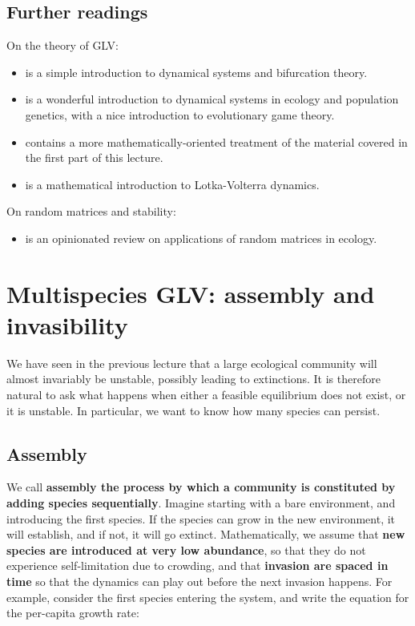 \documentclass[]{book}
\providecommand{\tightlist}{%
  \setlength{\itemsep}{0pt}\setlength{\parskip}{0pt}}
\begin{document}
\hypertarget{further-readings}{%
\section{Further readings}\label{further-readings}}

On the theory of GLV:

\begin{itemize}
\item
  \citet{strogatz2018nonlinear} is a simple introduction to dynamical systems and bifurcation theory.
\item
  \citet{hofbauer1998evolutionary} is a wonderful introduction to dynamical systems in ecology and population genetics, with a nice introduction to evolutionary game theory.
\item
  \citet{hadeler2017topics} contains a more mathematically-oriented treatment of the material covered in the first part of this lecture.
\item
  \citet{baigent2016lotka} is a mathematical introduction to Lotka-Volterra dynamics.
\end{itemize}

On random matrices and stability:

\begin{itemize}
\tightlist
\item
  \citet{allesina2015stability} is an opinionated review on applications of random matrices in ecology.
\end{itemize}

\hypertarget{multi}{%
\chapter{Multispecies GLV: assembly and invasibility}\label{multi}}

We have seen in the previous lecture that a large ecological community will almost invariably be unstable, possibly leading to extinctions. It is therefore natural to ask what happens when either a feasible equilibrium does not exist, or it is unstable. In particular, we want to know how many species can persist.

\hypertarget{assembly}{%
\section{Assembly}\label{assembly}}

We call \textbf{assembly the process by which a community is constituted by adding species sequentially}. Imagine starting with a bare environment, and introducing the first species. If the species can grow in the new environment, it will establish, and if not, it will go extinct. Mathematically, we assume that \textbf{new species are introduced at very low abundance}, so that they do not experience self-limitation due to crowding, and that \textbf{invasion are spaced in time} so that the dynamics can play out before the next invasion happens. For example, consider the first species entering the system, and write the equation for the per-capita growth rate:
\end{document}
